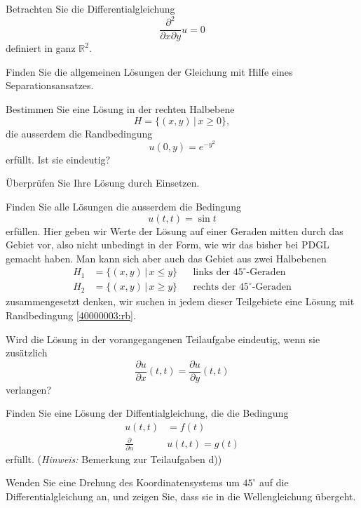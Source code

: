 Betrachten Sie die Differentialgleichung
\[
\frac{\partial^2}{\partial x\partial y}u=0
\]
definiert in ganz $\mathbb R^2$.
\begin{teilaufgaben}
\item
Finden Sie die allgemeinen Lösungen der Gleichung
mit Hilfe eines Separationsansatzes.
\item
Bestimmen Sie eine Lösung in der rechten Halbebene
\[
H=\{(x,y)\,|\, x\ge 0\},
\]
die ausserdem die Randbedingung
\[
u(0,y)=e^{-y^2}
\]
erfüllt. Ist sie eindeutig?
\item
Überprüfen Sie Ihre Lösung durch Einsetzen.
\item
Finden Sie alle Lösungen die ausserdem die Bedingung
\begin{equation}
u(t,t)=\sin t
\label{40000003:rb}
\end{equation}
erfüllen. Hier geben wir Werte der Lösung auf einer Geraden
mitten durch das Gebiet vor, also nicht unbedingt in der Form,
wie wir das bisher bei PDGL gemacht haben. Man kann sich aber
auch das Gebiet aus zwei Halbebenen
\begin{align*}
H_1&=\{(x,y)\,|\,x\le y\}&&\text{links der $45^\circ$-Geraden}
\\
H_2&=\{(x,y)\,|\,x\ge y\}&&\text{rechts der $45^\circ$-Geraden}
\end{align*}
zusammengesetzt denken, wir suchen in jedem dieser Teilgebiete eine
Lösung mit Randbedingung \eqref{40000003:rb}.
\label{40000003:halbebenen}
\item
Wird die Lösung in der vorangegangenen Teilaufgabe eindeutig, wenn sie
zusätzlich
\[
\frac{\partial u}{\partial x}(t,t)=\frac{\partial u}{\partial y}(t,t)
\]
verlangen?
\item
Finden Sie eine Lösung der Diffentialgleichung, die
die Bedingung
\begin{align*}
u(t,t)&=f(t)\\
\frac{\partial}{\partial n}&u(t,t)=g(t)
\end{align*}
erfüllt. ({\it Hinweis:} Bemerkung zur Teilaufgaben d))
\item
Wenden Sie eine Drehung des Koordinatensystems um $45^\circ$
auf die Differentialgleichung an, und zeigen Sie,
dass sie in die Wellengleichung übergeht.
\end{teilaufgaben}

